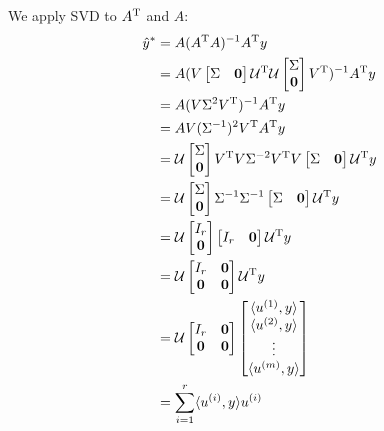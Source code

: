 We apply SVD to $A^{{\rm T}}$ and  $A$:
\begin{align*}
\hat{y}^* &= A(A^{{\rm T}}A)^{-1}A^{{\rm T}}y\\
&= A(V
\begin{bmatrix}
\Sigma & \textbf{0}
\end{bmatrix}
\mathcal{U}^{{\rm T}}\mathcal{U}
\begin{bmatrix}
\Sigma \\
\textbf{0}
\end{bmatrix}
V^{{\rm T}})^{-1}A^{{\rm T}}y\\
&= A(V\Sigma^2V^{{\rm T}})^{-1}A^{{\rm T}}y\\
&= AV(\Sigma^{-1})^2V^{{\rm T}}A^{{\rm T}}y\\
&= \mathcal{U}
\begin{bmatrix}
\Sigma \\
\textbf{0}
\end{bmatrix}
V^{{\rm T}}V\Sigma^{-2}V^{{\rm T}}V
\begin{bmatrix}
\Sigma & \textbf{0}
\end{bmatrix}
\mathcal{U}^{{\rm T}}y\\
&= \mathcal{U}
\begin{bmatrix}
\Sigma \\
\textbf{0}
\end{bmatrix}
\Sigma^{-1}\Sigma^{-1}
\begin{bmatrix}
\Sigma & \textbf{0}
\end{bmatrix}
\mathcal{U}^{{\rm T}}y\\
&= \mathcal{U}
\begin{bmatrix}
I_r\\
\textbf{0}
\end{bmatrix}
\begin{bmatrix}
I_r & \textbf{0}
\end{bmatrix}
\mathcal{U}^{{\rm T}}y\\
&= \mathcal{U}
\begin{bmatrix}
I_r& \textbf{0}\\
\textbf{0} & \textbf{0}
\end{bmatrix}
\mathcal{U}^{{\rm T}}y\\
&= \mathcal{U}
\begin{bmatrix}
I_r& \textbf{0}\\
\textbf{0} &  \textbf{0}
\end{bmatrix}
\begin{bmatrix}
\langle u^{(1)}, y\rangle\\
\langle u^{(2)}, y\rangle \\
\vdots\\
\langle u^{(m)}, y\rangle
\end{bmatrix}\\
&= \sum^r_{i=1}\langle u^{(i)}, y\rangle u^{(i)}
\end{align*}


